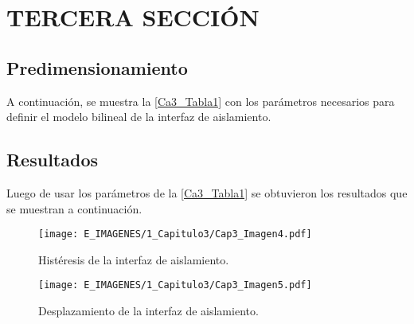 \section{TERCERA SECCIÓN}

\lipsum[10]

\subsection{Predimensionamiento}

A continuación, se muestra la \autoref{Ca3_Tabla1} con los parámetros necesarios para definir el modelo bilineal de la interfaz de aislamiento.


\subsection{Resultados} \label{subsection:Resul}

\lipsum[11]

Luego de usar los parámetros de la \autoref{Ca3_Tabla1} se obtuvieron los resultados que se muestran a continuación.

\begin{figure}[!h]
	\centering
	\texttt{[image: E\_IMAGENES/1\_Capitulo3/Cap3\_Imagen4.pdf]}
	\vspace{-3 mm}
	\caption[Histéresis de la interfaz de aislamiento]{\centering\footnotesize Histéresis de la interfaz de aislamiento.}
	\label{Cap3_Figura4}
\end{figure}


\begin{figure}[!h]
	\centering
	\texttt{[image: E\_IMAGENES/1\_Capitulo3/Cap3\_Imagen5.pdf]}
	\vspace{-3 mm}
	\caption[Desplazamiento de la interfaz de aislamiento]{\centering\footnotesize Desplazamiento de la interfaz de aislamiento.}
	\label{Cap3_Figura5}
\end{figure}

